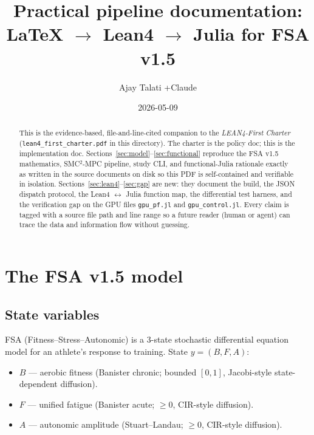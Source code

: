 \documentclass[11pt,a4paper]{article}
\title{Practical pipeline documentation:\\
       \large LaTeX $\to$ Lean4 $\to$ Julia for FSA v1.5}
\author{Ajay Talati \quad+\quad Claude}
\date{2026-05-09}
\begin{document}
\maketitle

\begin{abstract}
This is the evidence-based, file-and-line-cited companion to the
\emph{LEAN4-First Charter} (\texttt{lean4\_first\_charter.pdf} in this
directory). The charter is the policy doc; this is the implementation
doc. Sections~\ref{sec:model}--\ref{sec:functional} reproduce the FSA
v1.5 mathematics, SMC$^2$-MPC pipeline, study CLI, and functional-Julia
rationale exactly as written in the source documents on disk so this
PDF is self-contained and verifiable in isolation.
Sections~\ref{sec:lean4}--\ref{sec:gap} are new: they document the
build, the JSON dispatch protocol, the Lean4 $\leftrightarrow$ Julia
function map, the differential test harness, and the verification gap
on the GPU files \texttt{gpu\_pf.jl} and \texttt{gpu\_control.jl}. Every
claim is tagged with a source file path and line range so a future
reader (human or agent) can trace the data and information flow without
guessing.
\end{abstract}

\tableofcontents
\clearpage


\section{The FSA v1.5 model}
\label{sec:model}

\subsection{State variables}

FSA (Fitness--Stress--Autonomic) is a 3-state stochastic differential
equation model for an athlete's response to training. State
$y = (B, F, A)$:

\begin{itemize}[itemsep=2pt]
  \item $B$ --- aerobic fitness (Banister chronic; bounded $[0, 1]$,
        Jacobi-style state-dependent diffusion).
  \item $F$ --- unified fatigue (Banister acute; $\geq 0$, CIR-style
        diffusion).
  \item $A$ --- autonomic amplitude (Stuart--Landau; $\geq 0$, CIR-style
        diffusion).
\end{itemize}
\end{document}
